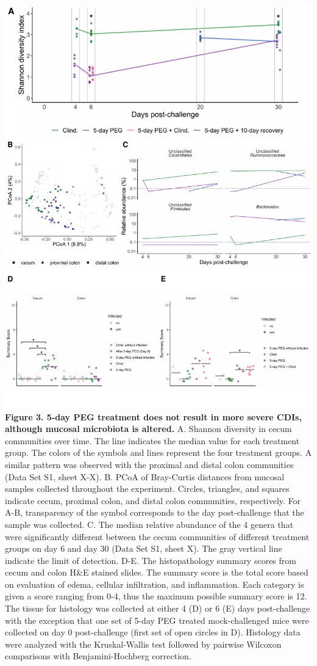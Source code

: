 \documentclass[
  11pt,
]{article}
\begin{document}
\includegraphics{figure_3.pdf} \textbf{Figure 3. 5-day PEG treatment
does not result in more severe CDIs, although mucosal microbiota is
altered.} A. Shannon diversity in cecum communities over time. The line
indicates the median value for each treatment group. The colors of the
symbols and lines represent the four treatment groups. A similar pattern
was observed with the proximal and distal colon communities (Data Set
S1, sheet X-X). B. PCoA of Bray-Curtis distances from mucosal samples
collected throughout the experiment. Circles, triangles, and squares
indicate cecum, proximal colon, and distal colon communities,
respectively. For A-B, transparency of the symbol corresponds to the day
post-challenge that the sample was collected. C. The median relative
abundance of the 4 genera that were significantly different between the
cecum communities of different treatment groups on day 6 and day 30
(Data Set S1, sheet X). The gray vertical line indicate the limit of
detection. D-E. The histopathology summary scores from cecum and colon
H\&E stained slides. The summary score is the total score based on
evaluation of edema, cellular infiltration, and inflammation. Each
category is given a score ranging from 0-4, thus the maximum possible
summary score is 12. The tissue for histology was collected at either 4
(D) or 6 (E) days post-challenge with the exception that one set of
5-day PEG treated mock-challenged mice were collected on day 0
post-challenge (first set of open circles in D). Histology data were
analyzed with the Kruskal-Wallis test followed by pairwise Wilcoxon
comparisons with Benjamini-Hochberg correction. \newpage
\end{document}
